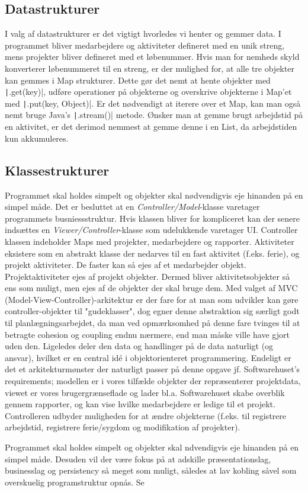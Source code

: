 \subsection{Datastrukturer} I valg af datastrukturer er det vigtigt hvorledes vi henter og gemmer data. I programmet bliver medarbejdere og aktiviteter defineret med en unik streng, mens projekter bliver defineret med et løbenummer. Hvis man for nemheds skyld konverterer løbenummeret til en streng, er der mulighed for, at alle tre objekter kan gemmes i Map strukturer. Dette gør det nemt at hente objekter med \texttt|.get(key)|, udføre operationer på objekterne og overskrive objekterne i Map'et med \texttt|.put(key, Object)|. Er det nødvendigt at iterere over et Map, kan man også nemt bruge Java's \texttt|.stream()| metode. Ønsker man at gemme brugt arbejdstid på en aktivitet, er det derimod nemmest at gemme denne i en List, da arbejdstiden kun akkumuleres.
\subsection{Klassestrukturer} Programmet skal holdes simpelt og objekter skal nødvendigvis eje hinanden på en simpel måde. Det er besluttet at en \emph{Controller/Model}-klasse varetager programmets busniessstruktur. Hvis klassen bliver for kompliceret kan der senere indsættes en \emph{Viewer/Controller}-klasse som udelukkende varetager UI. Controller klassen indeholder Maps med projekter, medarbejdere og rapporter. Aktiviteter eksistere som en abstrakt klasse der nedarves til en fast aktivitet (f.eks. ferie), og projekt aktiviteter. De faster kan så ejes af et medarbejder objekt. Projektaktiviteter ejes af projekt objekter. Dermed bliver aktivitetsobjekter så ens som muligt, men ejes af de objekter der skal bruge dem. Med valget af MVC (Model-View-Controller)-arkitektur er der fare for at man som udvikler kan gøre controller-objekter til "gudeklasser", dog egner denne abstraktion sig særligt godt til planlægningsarbejdet, da man ved opmærksomhed på denne fare tvinges til at betragte cohesion og coupling endnu nærmere, end man måske ville have gjort uden den. Ligeledes deler den data og handlinger på de data naturligt (og ansvar), hvilket er en central idé i objektorienteret programmering. Endeligt er det et arkitekturmønster der naturligt passer på denne opgave jf. Softwarehuset's requirements; modellen er i vores tilfælde objekter der repræsenterer projektdata, viewet er vores brugergrænseflade og lader bl.a. Softwarehuset skabe overblik gennem rapporter, og kan vise hvilke medarbejdere er ledige til et projekt. Controlleren udbyder muligheden for at ændre objekterne (f.eks. til registrere arbejdstid, registrere ferie/sygdom og modifikation af projekter).




Programmet skal holdes simpelt og objekter skal ndvendigvis eje hinanden på en simpel måde. Desuden vil der være fokus på at adskille præsentationslag, businesslag og persistency så meget som muligt, således at lav kobling såvel som overskuelig programstruktur opnås. Se